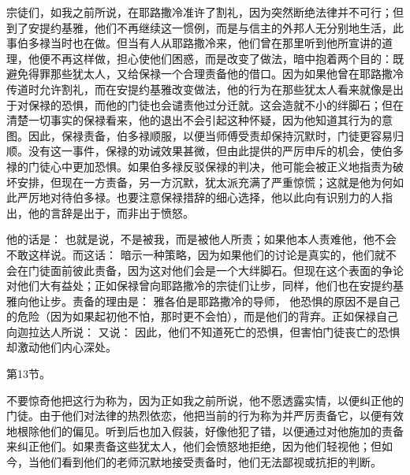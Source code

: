 宗徒们，如我之前所说，在耶路撒冷准许了割礼，因为突然断绝法律并不可行；但到了安提约基雅，他们不再继续这一惯例，而是与信主的外邦人无分别地生活，此事伯多禄当时也在做。但当有人从耶路撒冷来，他们曾在那里听到他所宣讲的道理，他便不再这样做，担心使他们困惑，而是改变了做法，暗中抱着两个目的：既避免得罪那些犹太人，又给保禄一个合理责备他的借口。因为如果他曾在耶路撒冷传道时允许割礼，而在安提约基雅改变做法，他的行为在那些犹太人看来就像是出于对保禄的恐惧，而他的门徒也会谴责他过分迁就。这会造就不小的绊脚石；但在清楚一切事实的保禄看来，他的退出不会引起这种怀疑，因为他知道其行为的意图。因此，保禄责备，伯多禄顺服，以便当师傅受责却保持沉默时，门徒更容易归顺。没有这一事件，保禄的劝诫效果甚微，但由此提供的严厉申斥的机会，使伯多禄的门徒心中更加恐惧。如果伯多禄反驳保禄的判决，他可能会被正义地指责为破坏安排，但现在一方责备，另一方沉默，犹太派充满了严重惊慌；这就是他为何如此严厉地对待伯多禄。也要注意保禄措辞的细心选择，他以此向有识别力的人指出，他的言辞是出于，而非出于愤怒。\par

他的话是： 也就是说，不是被我，而是被他人所责；如果他本人责难他，他不会不敢这样说。而这话： 暗示一种策略，因为如果他们的讨论是真实的，他们就不会在门徒面前彼此责备，因为这对他们会是一个大绊脚石。但现在这个表面的争论对他们大有益处；正如保禄曾向耶路撒冷的宗徒们让步，同样，他们也在安提约基雅向他让步。责备的理由是： 雅各伯是耶路撒冷的导师， 他恐惧的原因不是自己的危险（因为如果起初他不怕，那时更不会怕），而是他们的背弃。正如保禄自己向迦拉达人所说： 又说： 因此，他们不知道死亡的恐惧，但害怕门徒丧亡的恐惧却激动他们内心深处。\par

第13节。\par

不要惊奇他把这行为称为，因为正如我之前所说，他不愿透露实情，以便纠正他的门徒。由于他们对法律的热烈依恋，他把当前的行为称为并严厉责备它，以便有效地根除他们的偏见。听到后也加入假装，好像他犯了错，以便通过对他施加的责备来纠正他们。如果责备这些犹太人，他们会愤怒地拒绝，因为他们轻视他；但如今，当他们看到他们的老师沉默地接受责备时，他们无法鄙视或抗拒的判断。\par

